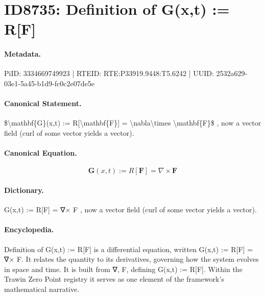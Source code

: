 \section*{ID8735: Definition of G(x,t) := R[F]}
\paragraph{Metadata.}
PiID: 3334669749923 | RTEID: RTE:P33919.9448:T5.6242 | UUID: 2532a629-03e1-5a45-b1d9-fc0c2e07de5e

\paragraph{Canonical Statement.}
\$\textbackslash{}mathbf\{G\}(x,t) := R[\textbackslash{}mathbf\{F\}] = \textbackslash{}nabla\textbackslash{}times \textbackslash{}mathbf\{F\}\$ , now a vector field (curl of some vector yields a vector).

\paragraph{Canonical Equation.}
\[
\mathbf{G}(x,t) := R[\mathbf{F}] = \nabla\times \mathbf{F}
\]

\paragraph{Dictionary.}
G(x,t) := R[F] = ∇× F , now a vector field (curl of some vector yields a vector).

\paragraph{Encyclopedia.}
Definition of G(x,t) := R[F] is a differential equation, written G(x,t) := R[F] = ∇× F. It relates the quantity to its derivatives, governing how the system evolves in space and time. It is built from ∇, F, defining G(x,t) := R[F]. Within the Trawin Zero Point registry it serves as one element of the framework's mathematical narrative.
